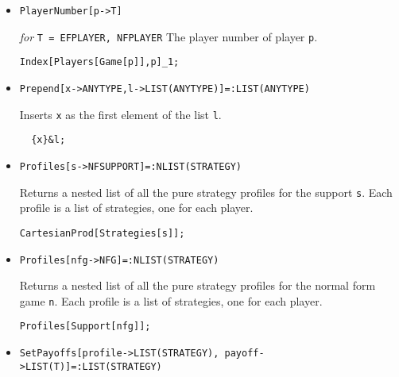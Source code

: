 \begin{itemize}
\item{}
\protect \large \begin{verbatim}
PlayerNumber[p->T]
\end{verbatim}\normalsize

{\it for} {\tt T = EFPLAYER, NFPLAYER}
\bd 
The player number of player \verb+p+.
\begin{verbatim}
Index[Players[Game[p]],p]_1;
\end{verbatim} 
\ed

\item{}
\protect \large \begin{verbatim}
Prepend[x->ANYTYPE,l->LIST(ANYTYPE)]=:LIST(ANYTYPE)
\end{verbatim}\normalsize

\bd 
Inserts \verb+x+ as the first element of the list \verb+l+.  
\begin{verbatim}
  {x}&l;
\end{verbatim} 
\ed

\item{}
\protect \large \begin{verbatim}
Profiles[s->NFSUPPORT]=:NLIST(STRATEGY)
\end{verbatim}\normalsize

\bd 
Returns a nested list of all the pure strategy profiles for the support
\verb+s+.  Each profile is a list of strategies, one for each player.  
\begin{verbatim}
CartesianProd[Strategies[s]];
\end{verbatim} 
\ed


\item{}
\protect \large \begin{verbatim}
Profiles[nfg->NFG]=:NLIST(STRATEGY)
\end{verbatim}\normalsize

\bd 
Returns a nested list of all the pure strategy profiles for the normal
form game \verb+n+.  Each profile is a list of strategies, one for
each player.
\begin{verbatim}
Profiles[Support[nfg]];
\end{verbatim} 
\ed


\item{}
\protect \large \begin{verbatim}
SetPayoffs[profile->LIST(STRATEGY), payoff->LIST(T)]=:LIST(STRATEGY)
\end{verbatim}\normalsize
 

\end{itemize}

